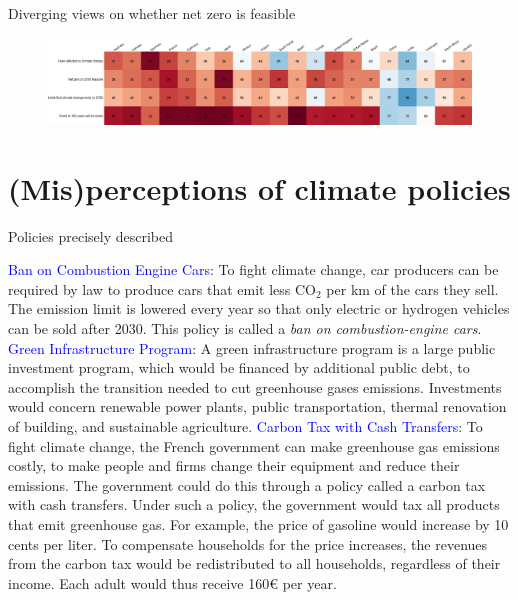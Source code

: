 \begin{frame}{Diverging views on whether net zero is feasible}%
	\begin{figure}[h!]
	\centering
	\includegraphics[width=\textwidth]{../figures/country_comparison/future_positive_countries.png} \\
	\end{figure}
\end{frame}

\section{(Mis)perceptions of climate policies}

\begin{frame}{Policies precisely described}%
	\begin{itemize}
	\ip \textcolor{blue}{Ban on Combustion Engine Cars}: To fight climate change, car producers can be required by law to produce cars that emit less CO$_\text{2}$ per km of the cars they sell. The emission limit is lowered every year so that only electric or hydrogen vehicles can be sold after 2030. This policy is called a \textit{ban on combustion-engine cars}.
	\ip \textcolor{blue}{Green Infrastructure Program}: A green infrastructure program is a large public investment program, which would be financed by additional public debt, to accomplish the transition needed to cut greenhouse gases emissions. Investments would concern renewable power plants, public transportation, thermal renovation of building, and sustainable agriculture.
	\ip \textcolor{blue}{Carbon Tax with Cash Transfers}: To fight climate change, the French government can make greenhouse gas emissions costly, to make people and firms change their equipment and reduce their emissions. The government could do this through a policy called a carbon tax with cash transfers. Under such a policy, the government would tax all products that emit greenhouse gas. For example, the price of gasoline would increase by 10 cents per liter. To compensate households for the price increases, the revenues from the carbon tax would be redistributed to all households, regardless of their income. Each adult would thus receive 160\euro{} per year.
	\end{itemize}
\end{frame}
	


